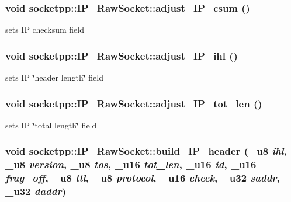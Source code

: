 \hypertarget{classsocketpp_1_1IP__RawSocket_187bab79c6a8bae17b400a132063a9d1}{
\subsubsection[{adjust\_\-IP\_\-csum}]{\setlength{\rightskip}{0pt plus 5cm}void socketpp::IP\_\-RawSocket::adjust\_\-IP\_\-csum ()}}
\label{classsocketpp_1_1IP__RawSocket_187bab79c6a8bae17b400a132063a9d1}


sets IP checksum field 

\hypertarget{classsocketpp_1_1IP__RawSocket_d84d5e193a15baf421c64011a9c27359}{
\subsubsection[{adjust\_\-IP\_\-ihl}]{\setlength{\rightskip}{0pt plus 5cm}void socketpp::IP\_\-RawSocket::adjust\_\-IP\_\-ihl ()}}
\label{classsocketpp_1_1IP__RawSocket_d84d5e193a15baf421c64011a9c27359}


sets IP \char`\"{}header length\char`\"{} field 

\hypertarget{classsocketpp_1_1IP__RawSocket_32d2c08139fb43abb92679bdabecf778}{
\subsubsection[{adjust\_\-IP\_\-tot\_\-len}]{\setlength{\rightskip}{0pt plus 5cm}void socketpp::IP\_\-RawSocket::adjust\_\-IP\_\-tot\_\-len ()}}
\label{classsocketpp_1_1IP__RawSocket_32d2c08139fb43abb92679bdabecf778}


sets IP \char`\"{}total length\char`\"{} field 

\hypertarget{classsocketpp_1_1IP__RawSocket_661a0ec3a92e7cd5582e64a3d0ed5e80}{
\subsubsection[{build\_\-IP\_\-header}]{\setlength{\rightskip}{0pt plus 5cm}void socketpp::IP\_\-RawSocket::build\_\-IP\_\-header ({\bf \_\-u8} {\em ihl}, \/  {\bf \_\-u8} {\em version}, \/  {\bf \_\-u8} {\em tos}, \/  {\bf \_\-u16} {\em tot\_\-len}, \/  {\bf \_\-u16} {\em id}, \/  {\bf \_\-u16} {\em frag\_\-off}, \/  {\bf \_\-u8} {\em ttl}, \/  {\bf \_\-u8} {\em protocol}, \/  {\bf \_\-u16} {\em check}, \/  {\bf \_\-u32} {\em saddr}, \/  {\bf \_\-u32} {\em daddr})}}
\label{classsocketpp_1_1IP__RawSocket_661a0ec3a92e7cd5582e64a3d0ed5e80}



